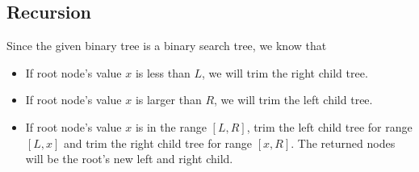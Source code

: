 \subsection{Recursion}
Since the given binary tree is a binary search tree, we know that 

\begin{itemize}
\item If root node's value $x$ is less than $L$, we will trim the right child tree.
\item If root node's value $x$ is larger than $R$, we will trim the left child tree.
\item If root node's value $x$ is in the range $[L, R]$, trim the left child tree for range $[L, x]$ and trim the right child tree for range $[x, R]$. The returned nodes will be the root's new left and right child.
\end{itemize}